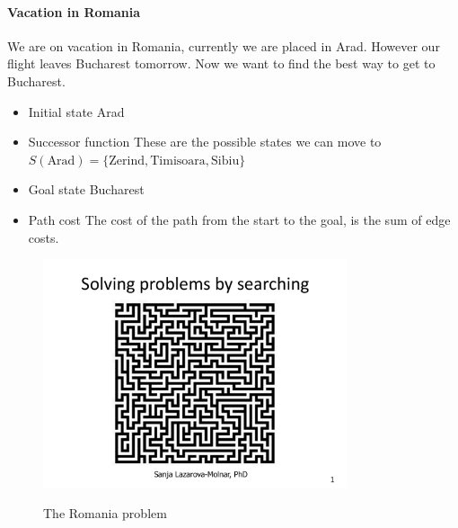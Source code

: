 \documentclass{article}
\begin{document}
\paragraph{Vacation in Romania} 
We are on vacation in Romania, currently we are placed in Arad. However our flight
leaves Bucharest tomorrow. Now we want to find the best way to get to Bucharest.

\begin{itemize}[noitemsep]
  \item Initial state
    \subitem Arad
  \item Successor function 
    \subitem These are the possible states we can move to $S(\text{Arad}) = \{\text{Zerind}, \text{Timisoara}, \text{Sibiu}\}$
  \item Goal state
    \subitem Bucharest
  \item Path cost
    \subitem The cost of the path from the start to the goal, is the sum of edge
    costs.
\end{itemize}

\begin{figure}[h]
  \centering
  \includegraphics[page=9,
  width=0.8\textwidth]{../presentations/w8_lec03_search_intro_2021.pdf}
  \label{fig:the_romania_problem}
  \caption{The Romania problem \cite[p.
  9]{presentation:solving_problems_by_searching}}
\end{figure}
\end{document}
